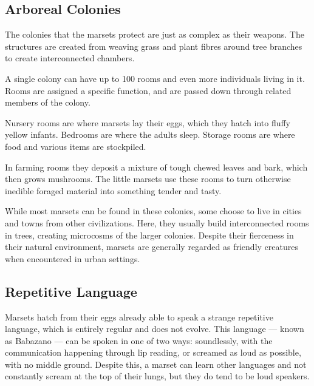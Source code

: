 
\subsection*{Arboreal Colonies}
    The colonies that the marsets protect are just as complex as their weapons.
    The structures are created from weaving grass and plant fibres around tree branches to create interconnected chambers.

    A single colony can have up to 100 rooms and even more individuals living in it.
    Rooms are assigned a specific function, and are passed down through related members of the colony.

    Nursery rooms are where marsets lay their eggs, which they hatch into fluffy yellow infants.
    Bedrooms are where the adults sleep.
    Storage rooms are where food and various items are stockpiled.

    In farming rooms they deposit a mixture of tough chewed leaves and bark, which then grows mushrooms.
    The little marsets use these rooms to turn otherwise inedible foraged material into something tender and tasty.

    While most marsets can be found in these colonies, some choose to live in cities and towns from other civilizations.
    Here, they usually build interconnected rooms in trees, creating microcosms of the larger colonies.
    Despite their fierceness in their natural environment, marsets are generally regarded as friendly creatures when encountered in urban settings.


\subsection*{Repetitive Language}
    Marsets hatch from their eggs already able to speak a strange repetitive language, which is entirely regular and does not evolve.
    This language --- known as Babazano --- can be spoken in one of two ways: soundlessly, with the communication happening through lip reading, or screamed as loud as possible, with no middle ground.
    Despite this, a marset can learn other languages and not constantly scream at the top of their lungs, but they do tend to be loud speakers.

